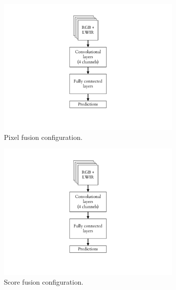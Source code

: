 \documentclass{l4proj}
\begin{document}
\begin{figure}[ht]
  \centering
  \begin{subfigure}[h!]{0.3\textwidth}
    \includegraphics[width=\textwidth, page={1}, trim={6.5cm 2.2cm 6.5cm 1.5cm}, clip]{images/models/archs}
    \caption{Pixel fusion configuration.}
    \label{fig:arch_stacked}
  \end{subfigure}
  \begin{subfigure}[h!]{0.3\textwidth}
    \includegraphics[width=\textwidth, page={2}, trim={6.5cm 2.2cm 6.5cm 1.5cm}, clip]{images/models/archs}
    \caption{Score fusion configuration.}
    \label{fig:arch_combsum}
  \end{subfigure}
  \begin{subfigure}[h!]{0.3\textwidth}

\end{subfigure}
\end{figure}
\end{document}
